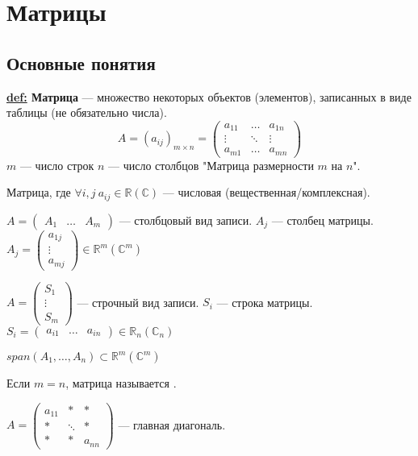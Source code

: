 \section{Матрицы}
\subsection{Основные понятия}
\textbf{\underline{def:} Матрица} --- множество некоторых объектов (элементов), записанных в виде таблицы (не обязательно числа).
\[ A = (a_{ij})_{m \times n} =
    \begin{pmatrix}
        a_{11} & \ldots & a_{1n} \\
        \vdots & \ddots & \vdots \\
        a_{m1} & \ldots & a_{mn}
    \end{pmatrix}\]
$m$ --- число строк
$n$ --- число столбцов
"Матрица размерности $m$ на $n$".

Матрица, где $ \forall i,j\ a_{ij} \in \mathbb{R}(\mathbb{C}) $ --- числовая (вещественная/комплексная).


\( A =
\begin{pmatrix}
    A_{1} & \ldots & A_{m}
\end{pmatrix}\) --- столбцовый вид записи.
$A_j$ --- столбец матрицы.
\( A_j =
\begin{pmatrix}
    a_{1j} \\
    \vdots \\
    a_{mj}
\end{pmatrix}
\in \mathbb{R}^m(\mathbb{C}^m)\)

\( A =
\begin{pmatrix}
    S_1    \\
    \vdots \\
    S_m
\end{pmatrix}\) --- строчный вид записи.
$S_i$ --- строка матрицы.
\( S_i =
\begin{pmatrix}
    a_{i1} & \ldots & a_{in}
\end{pmatrix}
\in \mathbb{R}_n(\mathbb{C}_n)\)

\( span(A_1, \ldots, A_n) \subset \mathbb{R}^m(\mathbb{C}^m)\)

Если $m = n$, матрица называется .


\( A =
\begin{pmatrix}
    a_{11} & *      & *      \\
    *      & \ddots & *      \\
    *      & *      & a_{nn}
\end{pmatrix}\) --- главная диагональ.


